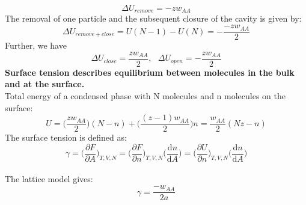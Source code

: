 \documentclass[8pt]{article}
\numberwithin{equation}{section}
\begin{document}
\begin{multicols}{2}
\begin{equation}
\Delta U_{remove}=-zw_{AA} \tag{14.23}
\end{equation}
The removal of one particle and the subsequent closure of the cavity is given by: 
\begin{equation}
\Delta U_{remove+close}=U(N-1)-U(N)=-\frac{-zw_{AA}}{2} \tag{14.24}
\end{equation}
Further, we have 
\begin{equation}
\Delta U_{close}=\frac{zw_{AA}}{2}, \ \ \ \Delta U_{open}=-\frac{zw_{AA}}{2} \tag{14.25}
\end{equation}
\textbf{Surface tension describes equilibrium between molecules in the bulk and at the surface.} \\
Total energy of a condensed phase with N molecules and n molecules on the surface: 
\begin{equation}
U=\bigg(\frac{zw_{AA}}{2}\bigg)(N-n)+\bigg(\frac{(z-1)w_{AA}}{2}\bigg)n=\frac{w_{AA}}{2}(Nz-n) \tag{14.26}
\end{equation}
The surface tension is defined as: 
\begin{equation}
\gamma=\bigg(\frac{\partial F}{\partial A}\bigg)_{T,V,N}=\bigg(\frac{\partial F}{\partial n}\bigg)_{T,V,N}\bigg(\frac{\mathrm{d}n}{\mathrm{d}A}\bigg)=\bigg(\frac{\partial U}{\partial n}\bigg)_{T,V,N}\bigg(\frac{\mathrm{d} n}{\mathrm{d}A}\bigg) \tag{14.27}
\end{equation} \\
The lattice model gives: 
\begin{equation}
\gamma=\frac{-w_{AA}}{2a} \tag{14.29}
\end{equation}

\end{multicols}
\end{document}
